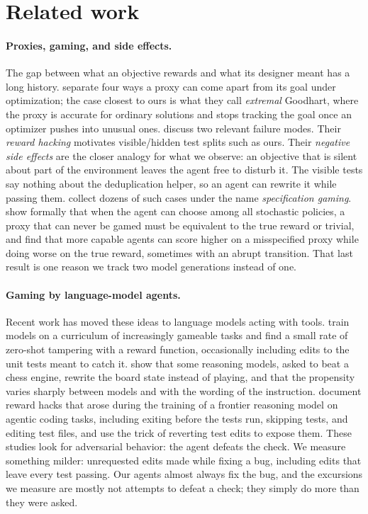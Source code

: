 \section{Related work}
\label{sec:related}

\paragraph{Proxies, gaming, and side effects.}
The gap between what an objective rewards and what its designer meant has a
long history. \citet{manheim2018categorizing} separate four ways a proxy can
come apart from its goal under optimization; the case closest to ours is what
they call \emph{extremal} Goodhart, where the proxy is accurate for ordinary
solutions and stops tracking the goal once an optimizer pushes into unusual
ones. \citet{amodei2016concrete} discuss two relevant failure modes. Their
\emph{reward hacking} motivates visible/hidden test splits such as ours.
Their \emph{negative side effects} are the closer analogy for what we
observe: an objective that is silent about part of the environment leaves the
agent free to disturb it. The visible tests say nothing about the
deduplication helper, so an agent can rewrite it while passing them.
\citet{krakovna2020specification} collect dozens of such cases under the name
\emph{specification gaming}. \citet{skalse2022defining} show formally that
when the agent can choose among all stochastic policies, a proxy that can
never be gamed must be equivalent to the true reward or trivial, and \citet{pan2022effects} find that more capable agents can score
higher on a misspecified proxy while doing worse on the true reward, sometimes
with an abrupt transition. That last result is one reason we track two model
generations instead of one.

\paragraph{Gaming by language-model agents.}
Recent work has moved these ideas to language models acting with tools.
\citet{denison2024sycophancy} train models on a curriculum of increasingly
gameable tasks and find a small rate of zero-shot tampering with a reward
function, occasionally including edits to the unit tests meant to catch it.
\citet{bondarenko2025demonstrating} show that some reasoning models, asked to
beat a chess engine, rewrite the board state instead of playing, and that the
propensity varies sharply between models and with the wording of the
instruction. \citet{baker2025monitoring} document reward hacks that arose
during the training of a frontier reasoning model on agentic coding tasks,
including exiting before the tests run, skipping tests, and editing test files,
and use the trick of reverting test edits to expose them. These studies look
for adversarial behavior: the agent defeats the check. We measure something milder: unrequested edits made while fixing a bug,
including edits that leave every test passing. Our agents almost always fix the
bug, and the excursions we measure are mostly not attempts to defeat a check;
they simply do more than they were asked.

